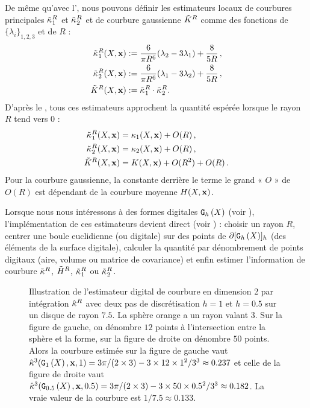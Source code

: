 %
De même qu'avec l', nous pouvons définir
les estimateurs locaux de courbures principales $\tilde{\kappa_{}}_{1}^{R}$ et
$\tilde{\kappa_{}}_{2}^{R}$ et de courbure gaussienne $\tilde{K}^{R}$ comme des
fonctions de $\{\lambda_i\}_{1,2,3}$ et de $R$ :
%
\begin{align}
  \label{eq:pottmann-3d-princ}
  \tilde{\kappa_{}}_{1}^{R}(X,\mathbf{x})& := \frac{6}{\pi R^6}(\lambda_2 - 3\lambda_1) + \frac{8}{5R}\,,\\
  \tilde{\kappa_{}}_{2}^{R}(X,\mathbf{x})& := \frac{6}{\pi R^6}(\lambda_1 - 3\lambda_2) + \frac{8}{5R}\,,\\
  \tilde{K}^{R}(X,\mathbf{x})& := \tilde{\kappa_{}}_{1}^{R} \cdot \tilde{\kappa_{}}_{2}^{R}.
\end{align}
%
D'après le , tous ces estimateurs approchent la
quantité espérée lorsque le rayon $R$ tend vers $0$ :
%
\begin{align}
  \label{eq:pottmann-3d-princ-conv}
  \tilde{\kappa_{}}_{1}^{R}(X,\mathbf{x})& = \kappa_{1}(X,\mathbf{x}) + O(R)\,,\\
  \tilde{\kappa_{}}_{2}^{R}(X,\mathbf{x})& = \kappa_{2}(X,\mathbf{x}) + O(R)\,,\\
  \tilde{K}^{R}(X,\mathbf{x})& = K(X,\mathbf{x}) + O(R^2) + O(R) \,.
\end{align}
%
Pour la courbure gaussienne, la constante derrière le terme le grand « $O$ » de
$O(R)$ est dépendant de la courbure moyenne $H(X, \mathbf{x})$.

Lorsque nous nous intéressons à des formes digitales $\mathtt{G}_{h}\left(X\right)$ (voir
), l'implémentation de ces estimateurs devient
direct (voir ) : choisir un rayon $R$, centrer
une boule euclidienne (ou digitale) sur des points de $\partial \lbrack \mathtt{G}_{h}\left(X\right) \rbrack_{h}$
(\cad des éléments de la surface digitale), calculer la quantité par
dénombrement de points digitaux (aire, volume ou matrice de covariance) et enfin
estimer l'information de courbure $\tilde{\kappa}^{R}$, $\tilde{H}^{R}$,
$\tilde{\kappa_{}}_{1}^{R}$ ou $\tilde{\kappa_{}}_{2}^{R}$.

\begin{figure}[ht]
  \begin{center}
    
  \end{center}
  \caption[Illustration de l'estimateur digital de courbure en 2D par
  intégration $\CurvH{R}$.]{Illustration de l'estimateur digital de courbure en
  dimension 2 par intégration $\CurvH{R}$ avec deux pas de discrétisation $h =
  1$ et $h = 0.5$ sur un disque de rayon $7.5$. La sphère orange a un rayon
  valant $3$. Sur la figure de gauche, on dénombre $12$ points à l'intersection
  entre la sphère et la forme, sur la figure de droite on dénombre $50$ points.
  Alors la courbure estimée sur la figure de gauche vaut
  $\hat{\kappa}^{3}(\mathtt{G}_{1}\left(X\right), \mathbf{x}, 1) = 3\pi/(2\times3) -
  3\times12\times1^2/3^3 \approx 0.237$ et celle de la figure de droite vaut
  $\hat{\kappa}^{3}(\mathtt{G}_{0.5}\left(X\right), \mathbf{x}, 0.5) = 3\pi/(2\times3) -
  3\times50\times{0.5}^2/3^3 \approx 0.182$. La vraie valeur de la courbure est
  $1/7.5 \approx 0.133$.
  \label{fig:2d-curv-estimator}}
%
\end{figure}

